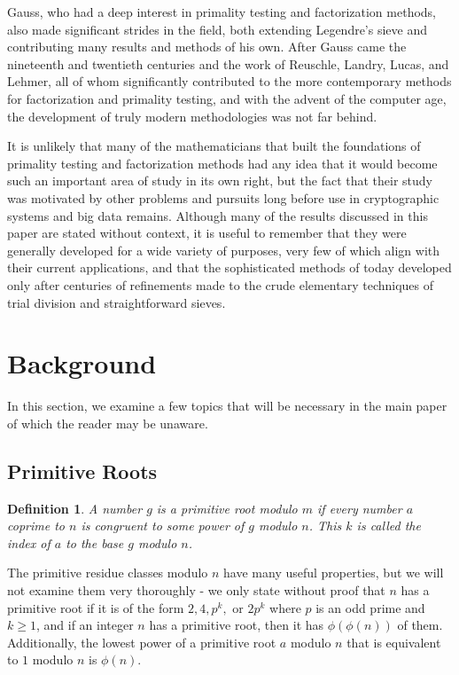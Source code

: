 \documentclass{article}
\newtheorem*{definition}{Definition}
\begin{document}
\par Gauss, who had a deep interest in primality testing and factorization methods, also made significant strides in the field, both extending Legendre's sieve and contributing many results and methods of his own. After Gauss came the nineteenth and twentieth centuries and the work of Reuschle, Landry, Lucas, and Lehmer, all of whom significantly contributed to the more contemporary methods for factorization and primality testing, and with the advent of the computer age, the development of truly modern methodologies was not far behind. 
\par It is unlikely that many of the mathematicians that built the foundations of primality testing and factorization methods had any idea that it would become such an important area of study in its own right, but the fact that their study was motivated by other problems and pursuits long before use in cryptographic systems and big data remains. Although many of the results discussed in this paper are stated without context, it is useful to remember that they were generally developed for a wide variety of purposes, very few of which align with their current applications, and that the sophisticated methods of today developed only after centuries of refinements made to the crude elementary techniques of trial division and straightforward sieves.

\section*{Background}\label{Background}

In this section, we examine a few topics that will be necessary in the main paper of which the reader may be unaware. 


\subsection*{Primitive Roots}
\begin{definition}
A number $g$ is a \textit{primitive root} modulo $m$ if every number $a$ coprime to $n$ is congruent to some power of $g$ modulo $n$. This $k$ is called the index of $a$ to the base $g$ modulo $n$.
\end{definition}
\par The primitive residue classes modulo $n$ have many useful properties, but we will not examine them very thoroughly - we only state without proof that $n$ has a primitive root if it is of the form $2, 4, p^k, \text{ or } 2p^k$ where $p$ is an odd prime and $k \geq 1$, and if an integer $n$ has a primitive root, then it has $\phi(\phi(n))$ of them. Additionally, the lowest power of a primitive root $a$ modulo $n$ that is equivalent to $1$ modulo $n$ is $\phi(n)$.
\end{document}
